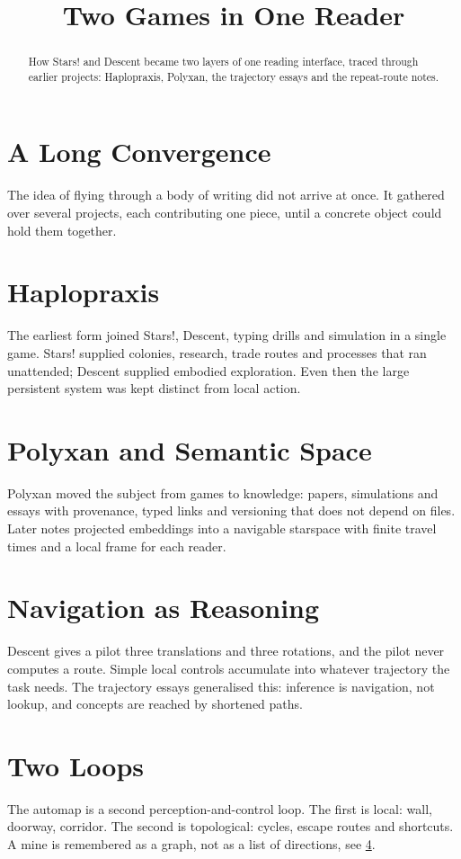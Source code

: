 \documentclass{article}
\title{Two Games in One Reader}
\begin{document}
\begin{abstract}
How Stars! and Descent became two layers of one reading interface, traced through earlier projects: Haplopraxis, Polyxan, the trajectory essays and the repeat-route notes.
\end{abstract}
\section{A Long Convergence}\label{sec:games-intro}
The idea of flying through a body of writing did not arrive at once. It gathered over several projects, each contributing one piece, until a concrete object could hold them together.
\section{Haplopraxis}\label{sec:games-haplopraxis}
The earliest form joined Stars!, Descent, typing drills and simulation in a single game. Stars! supplied colonies, research, trade routes and processes that ran unattended; Descent supplied embodied exploration. Even then the large persistent system was kept distinct from local action.
\section{Polyxan and Semantic Space}\label{sec:games-polyxan}
Polyxan moved the subject from games to knowledge: papers, simulations and essays with provenance, typed links and versioning that does not depend on files. Later notes projected embeddings into a navigable starspace with finite travel times and a local frame for each reader.
\section{Navigation as Reasoning}\label{sec:games-trajectories}
Descent gives a pilot three translations and three rotations, and the pilot never computes a route. Simple local controls accumulate into whatever trajectory the task needs. The trajectory essays generalised this: inference is navigation, not lookup, and concepts are reached by shortened paths.
\section{Two Loops}\label{sec:games-loops}
The automap is a second perception-and-control loop. The first is local: wall, doorway, corridor. The second is topological: cycles, escape routes and shortcuts. A mine is remembered as a graph, not as a list of directions, see \ref{sec:games-trajectories}.
\end{document}
